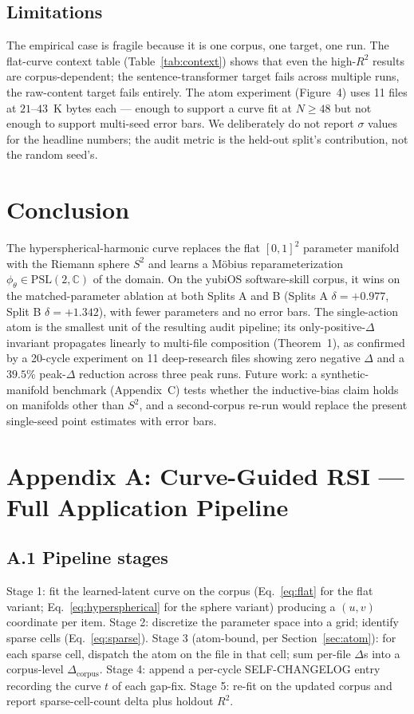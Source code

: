 \documentclass[11pt,a4paper]{article}
\begin{document}
\subsection{Limitations}
The empirical case is fragile because it is one corpus, one target, one run. The flat-curve context table (Table~\ref{tab:context}) shows that even the high-$R^2$ results are corpus-dependent; the sentence-transformer target fails across multiple runs, the raw-content target fails entirely. The atom experiment (Figure~4) uses 11 files at $21$--$43$~K bytes each --- enough to support a curve fit at $N \geq 48$ but not enough to support multi-seed error bars. We deliberately do not report $\sigma$ values for the headline numbers; the audit metric is the held-out split's contribution, not the random seed's.

\section{Conclusion}
The hyperspherical-harmonic curve replaces the flat $[0,1]^2$ parameter manifold with the Riemann sphere $S^2$ and learns a M\"obius reparameterization $\phi_\theta \in \mathrm{PSL}(2,\mathbb{C})$ of the domain. On the yubiOS software-skill corpus, it wins on the matched-parameter ablation at both Splits A and B (Splits A $\delta = +0.977$, Split B $\delta = +1.342$), with fewer parameters and no error bars. The single-action atom is the smallest unit of the resulting audit pipeline; its only-positive-$\Delta$ invariant propagates linearly to multi-file composition (Theorem~1), as confirmed by a 20-cycle experiment on 11 deep-research files showing zero negative $\Delta$ and a $39.5\%$ peak-$\Delta$ reduction across three peak runs. Future work: a synthetic-manifold benchmark (Appendix~C) tests whether the inductive-bias claim holds on manifolds other than $S^2$, and a second-corpus re-run would replace the present single-seed point estimates with error bars.

\section{Appendix A: Curve-Guided RSI --- Full Application Pipeline}

\subsection{A.1 Pipeline stages}
Stage 1: fit the learned-latent curve on the corpus (Eq.~\ref{eq:flat} for the flat variant; Eq.~\ref{eq:hyperspherical} for the sphere variant) producing a $(u, v)$ coordinate per item. Stage 2: discretize the parameter space into a grid; identify sparse cells (Eq.~\ref{eq:sparse}). Stage 3 (atom-bound, per Section~\ref{sec:atom}): for each sparse cell, dispatch the atom on the file in that cell; sum per-file $\Delta$s into a corpus-level $\Delta_{\mathrm{corpus}}$. Stage 4: append a per-cycle SELF-CHANGELOG entry recording the curve $t$ of each gap-fix. Stage 5: re-fit on the updated corpus and report sparse-cell-count delta plus holdout $R^2$.
\end{document}

